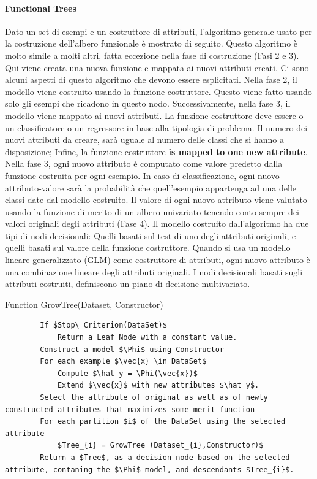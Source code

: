 \paragraph{Functional Trees}
Dato un set di esempi e un costruttore di attributi, l'algoritmo generale usato per la costruzione dell'albero funzionale è mostrato di seguito. Questo algoritmo è molto simile a molti altri, fatta eccezione nella fase di costruzione (Fasi 2 e 3). Qui viene creata una nuova funzione e mappata ai nuovi attributi creati. Ci sono alcuni aspetti di questo algoritmo che devono essere esplicitati. Nella fase 2, il modello viene costruito usando la funzione costruttore. Questo viene fatto usando solo gli esempi che ricadono in questo nodo. Successivamente, nella fase 3, il modello viene mappato ai nuovi attributi. La funzione costruttore deve essere o un classificatore o un regressore in base alla tipologia di problema. Il numero dei nuovi attributi da creare, sarà uguale al numero delle classi che si hanno a disposizione; Infine, la funzione costruttore \textbf{is mapped to one new attribute}. Nella fase 3, ogni nuovo attributo è computato come valore predetto dalla funzione costruita per ogni esempio. In caso di classificazione, ogni nuovo attributo-valore sarà la probabilità che quell'esempio appartenga ad una delle classi date dal modello costruito.
Il valore di ogni nuovo attributo viene valutato usando la funzione di merito di un albero univariato tenendo conto sempre dei valori originali degli attributi (Fase 4). Il modello costruito dall'algoritmo ha due tipi di nodi decisionali: Quelli basati sul test di uno degli attributi originali, e quelli basati sul valore della funzione costruttore. Quando si usa un modello lineare generalizzato (GLM) come costruttore di attributi, ogni nuovo attributo è una combinazione lineare degli attributi originali. I nodi decisionali basati sugli attributi costruiti, definiscono un piano di decisione multivariato.

\begin{algorithm}
	\caption{Function GrowTree(Dataset, Constructor)}
	\begin{lstlisting}
		If $Stop\_Criterion(DataSet)$
			Return a Leaf Node with a constant value.
		Construct a model $\Phi$ using Constructor
		For each example $\vec{x} \in DataSet$
			Compute $\hat y = \Phi(\vec{x})$
			Extend $\vec{x}$ with new attributes $\hat y$.
		Select the attribute of original as well as of newly constructed attributes that maximizes some merit-function
		For each partition $i$ of the DataSet using the selected attribute
			$Tree_{i} = GrowTree (Dataset_{i},Constructor)$
		Return a $Tree$, as a decision node based on the selected attribute, contaning the $\Phi$ model, and descendants $Tree_{i}$.
	\end{lstlisting}
\end{algorithm}

